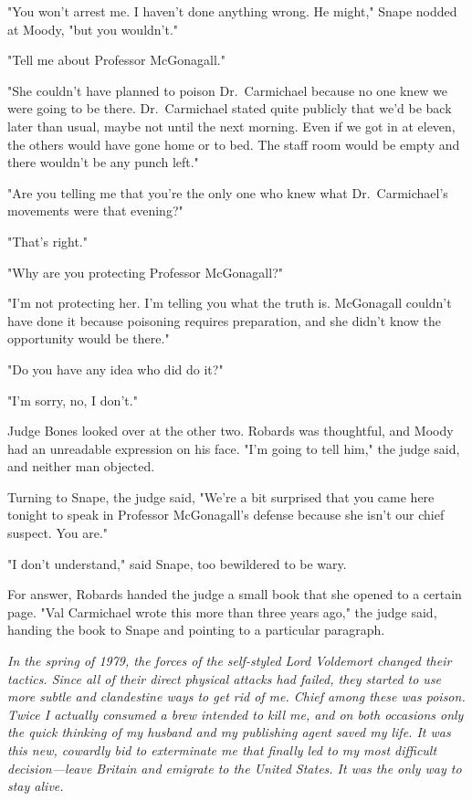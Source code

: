 "You won't arrest me. I haven't done anything wrong. He might," Snape nodded at Moody, "but you wouldn't."

"Tell me about Professor McGonagall."

"She couldn't have planned to poison Dr.~Carmichael because no one knew we were going to be there. Dr.~Carmichael stated quite publicly that we'd be back later than usual, maybe not until the next morning. Even if we got in at eleven, the others would have gone home or to bed. The staff room would be empty and there wouldn't be any punch left."

"Are you telling me that you're the only one who knew what Dr.~Carmichael's movements were that evening?"

"That's right."

"Why are you protecting Professor McGonagall?"

"I'm not protecting her. I'm telling you what the truth is. McGonagall couldn't have done it because poisoning requires preparation, and she didn't know the opportunity would be there."

"Do you have any idea who did do it?"

"I'm sorry, no, I don't."

Judge Bones looked over at the other two. Robards was thoughtful, and Moody had an unreadable expression on his face. "I'm going to tell him," the judge said, and neither man objected.

Turning to Snape, the judge said, "We're a bit surprised that you came here tonight to speak in Professor McGonagall's defense because she isn't our chief suspect. You are."

"I don't understand," said Snape, too bewildered to be wary.

For answer, Robards handed the judge a small book that she opened to a certain page. "Val Carmichael wrote this more than three years ago," the judge said, handing the book to Snape and pointing to a particular paragraph.

\emph{In the spring of 1979, the forces of the self-styled Lord Voldemort changed their tactics. Since all of their direct physical attacks had failed, they started to use more subtle and clandestine ways to get rid of me. Chief among these was poison. Twice I actually consumed a brew intended to kill me, and on both occasions only the quick thinking of my husband and my publishing agent saved my life. It was this new, cowardly bid to exterminate me that finally led to my most difficult decision—leave Britain and emigrate to the United States. It was the only way to stay alive.}

